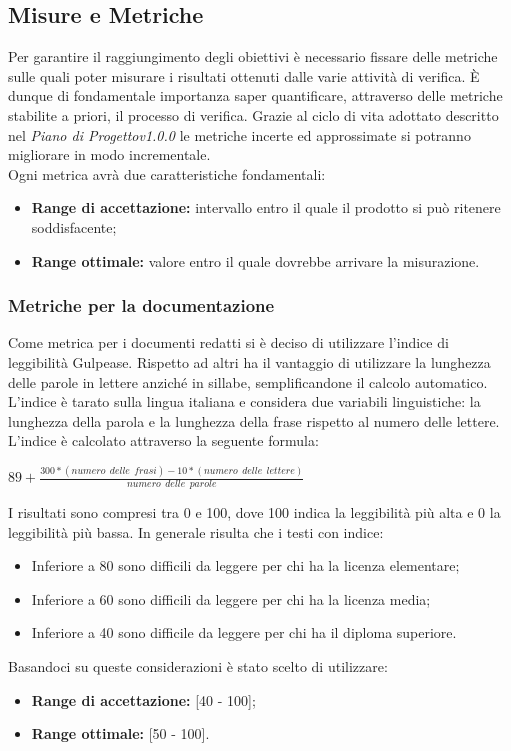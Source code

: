 \subsection{Misure e Metriche}
Per garantire il raggiungimento degli obiettivi è necessario fissare delle metriche sulle quali poter misurare i risultati ottenuti dalle varie attività di verifica. È dunque di fondamentale importanza saper quantificare, attraverso delle metriche stabilite a priori, il processo di verifica. Grazie al ciclo di vita adottato descritto nel \textit{Piano di Progettov1.0.0} le metriche incerte ed approssimate si potranno migliorare in modo incrementale.\\
Ogni metrica avrà due caratteristiche fondamentali:
\begin{itemize}
	\item \textbf{Range di accettazione:} intervallo entro il quale il prodotto si può ritenere soddisfacente;
	\item \textbf{Range ottimale:} valore entro il quale dovrebbe arrivare la misurazione.
\end{itemize} 
	\subsubsection{Metriche per la documentazione}
	Come metrica per i documenti redatti si è deciso di utilizzare l'indice di leggibilità Gulpease. Rispetto ad altri ha il vantaggio di utilizzare la lunghezza delle parole in lettere anziché in sillabe, semplificandone il calcolo automatico. L'indice è tarato sulla lingua italiana e considera due variabili linguistiche: la lunghezza della parola e la lunghezza della frase rispetto al numero delle lettere. \\
	L'indice è calcolato attraverso la seguente formula:\\
	\begin{center}
	$89+ \frac{300*\left(numero\:\ delle\:\ frasi \right)-10*\left(numero\:\ delle\:\ lettere\right)}{numero\:\ delle\:\ parole}$
	\end{center}
	I risultati sono compresi tra 0 e 100, dove 100 indica la leggibilità più alta e 0 la leggibilità più bassa. In generale risulta che i testi con indice:
	\begin{itemize}
		\item Inferiore a 80 sono difficili da leggere per chi ha la licenza elementare;
		\item Inferiore a 60 sono difficili da leggere per chi ha la licenza media;
		\item Inferiore a 40 sono difficile da leggere per chi ha il diploma superiore.
	\end{itemize}
	Basandoci su queste considerazioni è stato scelto di utilizzare:
	\begin{itemize}
		\item \textbf{Range di accettazione:} [40 - 100];
		\item \textbf{Range ottimale:} [50 - 100].
	\end{itemize}
	
